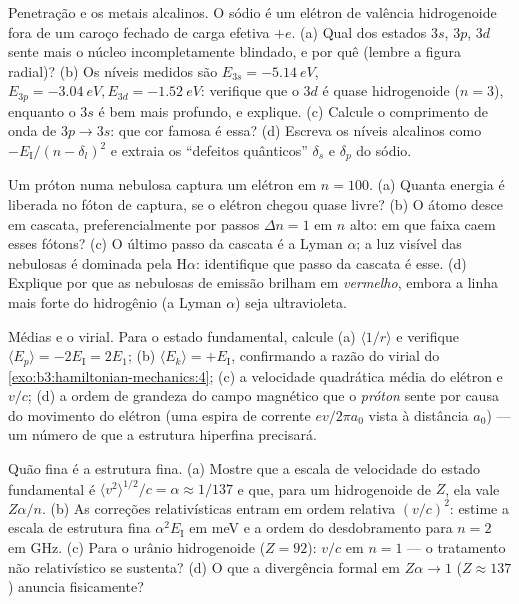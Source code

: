 \begin{exercise}[$\star\star$]\label{exo:b3:hydrogen-atom:8}
Penetração e os metais alcalinos. O sódio é um elétron de valência
hidrogenoide fora de um caroço fechado de carga efetiva $+e$.
(a) Qual dos estados $3s$, $3p$, $3d$ sente mais o núcleo
incompletamente blindado, e por quê (lembre a figura radial)? (b) Os
níveis medidos são $E_{3s} = \qty{-5.14}{eV}$, $E_{3p} = \qty{-3.04}{eV},
E_{3d} = \qty{-1.52}{eV}$: verifique que o $3d$ é quase hidrogenoide
($n = 3$), enquanto o $3s$ é bem mais profundo, e explique. (c) Calcule
o comprimento de onda de $3p \to 3s$: que cor famosa é essa? (d)
Escreva os níveis alcalinos como $-E_{\text{I}}/(n - \delta_l)^2$ e
extraia os ``defeitos quânticos'' $\delta_s$ e $\delta_p$ do sódio.
\end{exercise}

\begin{exercise}[$\star\star$]\label{exo:b3:hydrogen-atom:9}
Um próton numa nebulosa captura um elétron em $n = 100$. (a) Quanta
energia é liberada no fóton de captura, se o elétron chegou quase
livre? (b) O átomo desce em cascata, preferencialmente por passos
$\Delta n = 1$ em $n$ alto: em que faixa caem esses fótons? (c) O
último passo da cascata é a Lyman $\alpha$; a luz visível das nebulosas
é dominada pela H$\alpha$: identifique que passo da cascata é esse. (d)
Explique por que as nebulosas de emissão brilham em \emph{vermelho},
embora a linha mais forte do hidrogênio (a Lyman $\alpha$) seja
ultravioleta.
\end{exercise}

\begin{exercise}[$\star\star\star$]\label{exo:b3:hydrogen-atom:10}
Médias e o virial. Para o estado fundamental, calcule (a)
$\langle 1/r\rangle$ e verifique $\langle E_p\rangle = -2E_{\text{I}}
= 2E_1$; (b) $\langle E_k\rangle = +E_{\text{I}}$, confirmando a razão
do virial do \cref{exo:b3:hamiltonian-mechanics:4}; (c) a velocidade
quadrática média do elétron e $v/c$; (d) a ordem de grandeza do campo magnético que o
\emph{próton} sente por causa do movimento do elétron (uma espira de
corrente $ev/2\pi a_0$ vista à distância $a_0$) --- um número de que a
estrutura hiperfina precisará.
\end{exercise}

\begin{exercise}[$\star\star\star$]\label{exo:b3:hydrogen-atom:11}
Quão fina é a estrutura fina. (a) Mostre que a escala de velocidade do
estado fundamental é $\langle v^2\rangle^{1/2}/c = \alpha \approx 1/137$
e que, para um hidrogenoide de $Z$, ela vale $Z\alpha/n$. (b) As
correções relativísticas entram em ordem relativa $(v/c)^2$: estime a
escala de estrutura fina $\alpha^2E_{\text{I}}$ em meV e a ordem do
desdobramento para $n = 2$ em GHz. (c) Para o urânio hidrogenoide
($Z = 92$): $v/c$ em $n = 1$ --- o tratamento não relativístico se
sustenta? (d) O que a divergência formal em $Z\alpha \to 1$
($Z \approx 137$) anuncia fisicamente?
\end{exercise}

